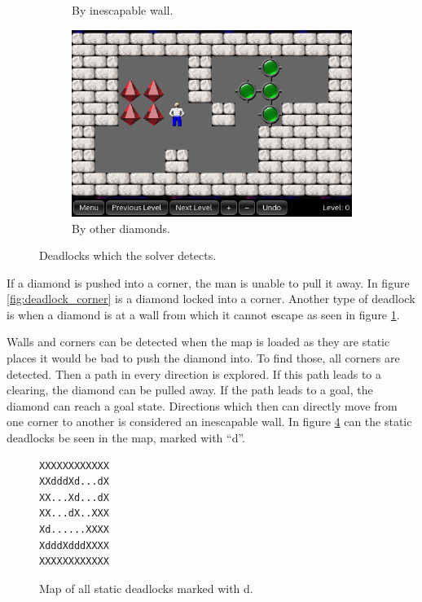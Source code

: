 \begin{figure}[h]
\begin{subfigure}{0.3\textwidth}
  \caption{By inescapable wall.}
  \label{fig:deadlock_wall}
\end{subfigure}
\begin{subfigure}{0.3\textwidth}
  \centering
  \includegraphics[width=\linewidth]{img/deadlock_diamond}
  \caption{By other diamonds.}
  \label{fig:deadlock_diamond}
\end{subfigure}
\caption{Deadlocks which the solver detects.}
\end{figure}

If a diamond is pushed into a corner, the man is unable to pull it away.
In figure \ref{fig:deadlock_corner} is a diamond locked into a corner.
Another type of deadlock is when a diamond is at a wall from which it cannot escape as seen in figure \ref{fig:deadlock_wall}.

Walls and corners can be detected when the map is loaded as they are static places it would be bad to push the diamond into.
To find those, all corners are detected.
Then a path in every direction is explored. 
If this path leads to a clearing, the diamond can be pulled away.
If the path leads to a goal, the diamond can reach a goal state.
Directions which then can directly move from one corner to another is considered an inescapable wall.
In figure \ref{fig:static_deadlocks} can the static deadlocks be seen in the map, marked with ``d''.

\begin{figure}[h]
 \centering
 \begin{minipage}{0.1\textwidth}
\begin{verbatim}
XXXXXXXXXXXX
XXdddXd...dX
XX...Xd...dX
XX...dX..XXX
Xd......XXXX
XdddXdddXXXX
XXXXXXXXXXXX
\end{verbatim}
 \end{minipage}
 \caption{Map of all static deadlocks marked with d.}
 \label{fig:static_deadlocks}
\end{figure}

